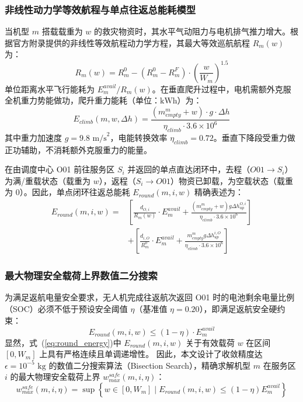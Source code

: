 \subsubsection{非线性动力学等效航程与单点往返总能耗模型}
当机型 $m$ 搭载载重为 $w$ 的救灾物资时，其水平气动阻力与电机排气推力增大。根据官方附录提供的非线性等效航程动力学方程，其最大等效巡航航程 $R_m(w)$ 为：
\begin{equation}
    R_m(w) = R_m^0 - \left(R_m^0 - R_m^F\right) \cdot \left(\frac{w}{W_m}\right)^{1.5}
    \label{eq:range_decay}
\end{equation}
单位距离水平飞行能耗为 $E_m^{avail} / R_m(w)$。在垂直爬升过程中，电机需额外克服全机重力势能做功，爬升重力能耗（单位：$\text{kWh}$）为：
\begin{equation}
    E_{climb}(m, w, \Delta h) = \frac{\left(m_{empty}^m + w\right) \cdot g \cdot \Delta h}{\eta_{climb} \cdot 3.6 \times 10^6}
    \label{eq:climb_energy}
\end{equation}
其中重力加速度 $g = 9.8\text{ m/s}^2$，电能转换效率 $\eta_{climb} = 0.72$。垂直下降段受重力做正功辅助，不消耗额外克服重力的能量。

在由调度中心 O01 前往服务区 $S_i$ 并返回的单点直达闭环中，去程（$O01 \to S_i$）为满/重载状态（载重为 $w$），返程（$S_i \to O01$）物资已卸载，为空载状态（载重为 $0$）。因此，单点闭环往返总能耗 $E_{round}(m, i, w)$ 精确表述为：
\begin{align}
    E_{round}(m, i, w) = & \left[ \frac{d_{O, i}}{R_m(w)} \cdot E_m^{avail} + \frac{(m_{empty}^m + w) g \Delta h_{up}^{O, i}}{\eta_{climb} \cdot 3.6 \times 10^6} \right] \nonumber \\
    & + \left[ \frac{d_{i, O}}{R_m^0} \cdot E_m^{avail} + \frac{m_{empty}^m g \Delta h_{up}^{i, O}}{\eta_{climb} \cdot 3.6 \times 10^6} \right]
    \label{eq:round_energy}
\end{align}

\subsubsection{最大物理安全载荷上界数值二分搜索}
为满足返航电量安全要求，无人机完成往返航次返回 O01 时的电池剩余电量比例（SOC）必须不低于预设安全阈值 $\eta$（基准值 $\eta=0.20$），即满足返航安全硬约束：
\begin{equation}
    E_{round}(m, i, w) \le (1 - \eta) \cdot E_m^{avail}
    \label{eq:safety_constraint}
\end{equation}
显然，式~(\ref{eq:round_energy})中 $E_{round}(m, i, w)$ 关于有效载荷 $w$ 在区间 $[0, W_m]$ 上具有严格连续且单调递增性。
因此，本文设计了收敛精度达 $\epsilon = 10^{-5}\text{ kg}$ 的数值二分搜索算法（Bisection Search），精确求解机型 $m$ 在服务区 $i$ 的最大物理安全载荷上界 $w_{max}^{safe}(m, i, \eta)$：
\begin{equation}
    w_{max}^{safe}(m, i, \eta) = \sup \left\{ w \in [0, W_m] \;\Big|\; E_{round}(m, i, w) \le (1 - \eta) E_m^{avail} \right\}
    \label{eq:safe_bisection}
\end{equation}

